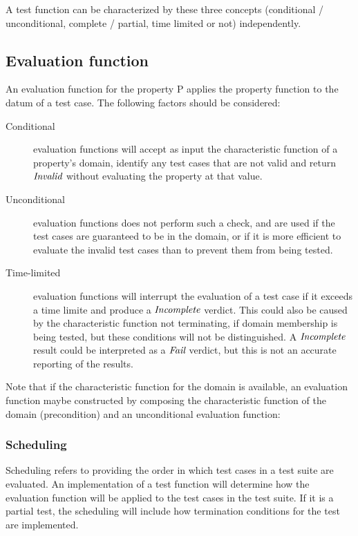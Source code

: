 A test function can be characterized by these three concepts
(conditional / unconditional, complete / partial, time limited or not) independently.

\subsection{Evaluation function}

An evaluation function for the property P
applies the property function to the datum of a test case.
The following factors should be considered:

\begin{description}
\item[Conditional] evaluation functions will accept as input the characteristic function of a property's domain,
identify any test cases that are not valid and return $\emph{Invalid}$ without evaluating the property at that value.
\item[Unconditional] evaluation functions does not perform such a check,
and are used if the test cases are guaranteed to be in the domain,
or if it is more efficient to evaluate the invalid test cases
than to prevent them from being tested.
\item[Time-limited] evaluation functions will interrupt the evaluation of a test case
if it exceeds a time limite and produce a $\emph{Incomplete}$ verdict.
This could also be caused by the characteristic function not terminating,
if domain membership is being tested,
but these conditions will not be distinguished.
A $\emph{Incomplete}$ result could be interpreted as a $\emph{Fail}$ verdict,
but this is not an accurate reporting of the results.
\end{description}

Note that if the characteristic function for the domain is available,
an evaluation function maybe constructed by composing
the characteristic function of the domain (precondition) and 
an unconditional evaluation function:


\subsubsection{Scheduling}
Scheduling refers to providing the order in which test cases in a test suite are evaluated.
An implementation of a test function will
determine how the evaluation function will be applied
to the test cases in the test suite.
If it is a partial test, the scheduling will include
how termination conditions for the test are implemented.

